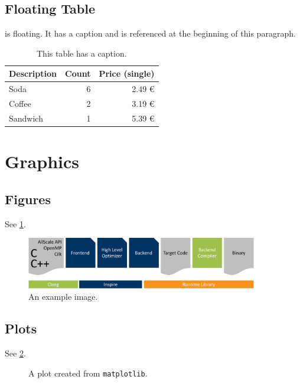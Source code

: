 \subsection{Floating Table}

 is floating. It has a caption and is referenced at the beginning of this paragraph.

\begin{table}
	\centering
	\begin{tabularx}{0.75\textwidth}{Xrr}
		\toprule
		Description & Count & Price (single)\\
		\midrule
		Soda & 6 & 2.49 €\\
		Coffee & 2 & 3.19 €\\
		Sandwich & 1 & 5.39 €\\
		\bottomrule
	\end{tabularx}
	\caption{This table has a caption.}
	\label{tbl:some_table}
\end{table}

\section{Graphics}

\subsection{Figures}

See \cref{fig:some_figure}.

\begin{figure}
	\centering
	\includegraphics[width=0.9\textwidth]{images/example.pdf}
	\caption{An example image.}
	\label{fig:some_figure}
\end{figure}

\subsection{Plots}

See \cref{fig:some_plot}.

\begin{figure}
	\centering
	
	\caption{A plot created from \texttt{matplotlib}.}
	\label{fig:some_plot}
\end{figure}

